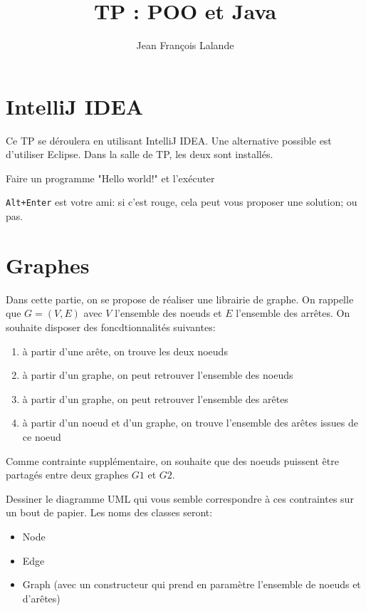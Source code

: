 \documentclass[11pt,TP,2A]{tdtp}
\title[TP]{TP : POO et Java}
\author{Jean François Lalande}
\begin{document}
\maketitle


\section{IntelliJ IDEA}

Ce TP se déroulera en utilisant IntelliJ IDEA. Une alternative possible est d'utiliser Eclipse. Dans la salle de TP, les deux sont installés.

\quest Faire un programme "Hello world!" et l'exécuter

\verb!Alt+Enter! est votre ami: si c'est rouge, cela peut vous proposer une solution; ou pas.

\section{Graphes}

Dans cette partie, on se propose de réaliser une librairie de graphe. On rappelle que $G=(V,E)$ avec $V$ l'ensemble des noeuds et $E$ l'ensemble des arrêtes. On souhaite disposer des foncdtionnalités suivantes:

\begin{enumerate}
\item à partir d'une arête, on trouve les deux noeuds
\item à partir d'un graphe, on peut retrouver l'ensemble des noeuds
\item à partir d'un graphe, on peut retrouver l'ensemble des arêtes
\item à partir d'un noeud et d'un graphe, on trouve l'ensemble des arêtes issues de ce noeud
\end{enumerate}

Comme contrainte supplémentaire, on souhaite que des noeuds puissent être partagés entre deux graphes $G1$ et $G2$.


\quest Dessiner le diagramme UML qui vous semble correspondre à ces contraintes sur un bout de papier. Les noms des classes seront:

\begin{itemize}
\item Node
\item Edge
\item Graph (avec un constructeur qui prend en paramètre l'ensemble de noeuds et d'arêtes)
\end{itemize}
\end{document}
